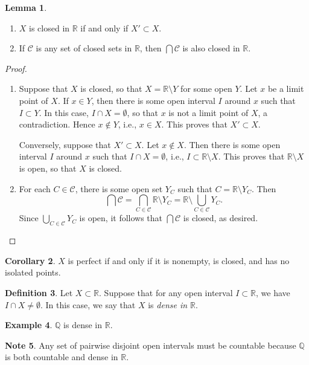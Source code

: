 \documentclass[10pt,letterpaper,cm]{nupset}
\theoremstyle{definition}
\newtheorem{definition}{Definition}[subsection]
\newtheorem{exmp}[definition]{Example}
\newtheorem{note}[definition]{Note}
\theoremstyle{theorem}
\newtheorem{lemma}[definition]{Lemma}
\newtheorem{corollary}[definition]{Corollary}
\theoremstyle{remark}
\newcommand{\Q}{\mathbb Q}
\newcommand{\R}{\mathbb R}
\newcommand{\1}{\mathbf{1}}
\newcommand{\0}{\vec 0}
\begin{document}
\begin{lemma} $ $
\begin{enumerate}
\item $X$ is closed in $\R$ if and only if $X' \subset X$.
\item If $\mathcal{C}$ is any set of closed sets in $\R$, then $\bigcap \mathcal{C}$ is also closed in $\R$.
\end{enumerate}
\end{lemma}
\begin{proof} $ $
\begin{enumerate}
\item Suppose that $X$ is closed, so that $X = \R \setminus Y$ for some open $Y$. Let $x$ be a limit point of $X$.  If $x\in Y$, then there is some open interval $I$ around $x$ such that $I\subset Y$. In this case, $I\cap X = \emptyset$, so that $x$ is not a limit point of $X$, a contradiction. Hence $x\notin Y$, i.e., $x\in X$. This proves that $X' \subset X$. 

Conversely, suppose that $X' \subset X$. Let $x\notin X$. Then there is some open interval $I$ around $x$ such that $I\cap X =\emptyset$, i.e., $I \subset \R \setminus X$.  This proves that $ \R \setminus X$ is open, so that $X$ is closed.
\item For each $C\in \mathcal{C}$, there is some open set $Y_C$ such that $C = \R \setminus Y_C$. Then $$\bigcap \mathcal{C} = \bigcap_{C \in \mathcal{C}} \R \setminus Y_C = \R \setminus \bigcup_{C\in \mathcal{C}} Y_C.$$ Since  $\bigcup_{C\in \mathcal{C}} Y_C$ is open, it follows that $\bigcap \mathcal{C}$ is closed, as desired. 
\end{enumerate}
\end{proof}

\begin{corollary}
$X$ is perfect if and only if it is nonempty, is closed, and has no isolated points. 
\end{corollary}

\begin{definition}
Let  $X \subset \R$. Suppose that for any open interval $I\subset \R$, we have $I \cap X \ne \emptyset$. In this case, we say that $X$ is \textit{dense in $\R$}.
\end{definition}

\begin{exmp}
$\Q$ is dense in $\R$.
\end{exmp}

\begin{note}
Any set of pairwise disjoint open intervals must be countable because $\Q$ is both countable and dense in $\R$.
\end{note}
\end{document}
